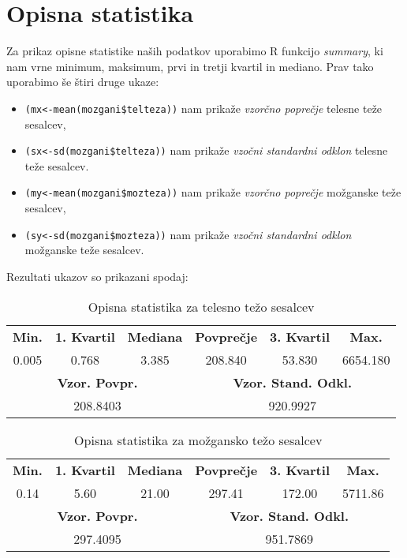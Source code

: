 \section{Opisna statistika}

Za prikaz opisne statistike naših podatkov uporabimo R funkcijo \emph{summary}, ki nam vrne minimum, maksimum,
prvi in tretji kvartil in mediano.
Prav tako uporabimo še štiri druge ukaze:

\begin{itemize}
    \item \verb|(mx<-mean(mozgani$telteza))|\label{en:mx} nam prikaže \emph{vzorčno poprečje} telesne teže sesalcev,
    \item \verb|(sx<-sd(mozgani$telteza))|\label{en:sx} nam prikaže \emph{vzočni standardni odklon} telesne teže sesalcev.
    \item \verb|(my<-mean(mozgani$mozteza))|\label{en:my} nam prikaže \emph{vzorčno poprečje} možganske teže sesalcev,
    \item \verb|(sy<-sd(mozgani$mozteza))|\label{en:sy} nam prikaže \emph{vzočni standardni odklon} možganske teže sesalcev.
\end{itemize}

\noindent
Rezultati ukazov so prikazani spodaj:

\begin{table}[h]
    \centering
    \begin{tabular}{|c|c|c|c|c|c|}
    \hline
    \textbf{Min.} & \textbf{1. Kvartil} & \textbf{Mediana} & \textbf{Povprečje} & \textbf{3. Kvartil} & \textbf{Max.} \\
    0.005 & 0.768 & 3.385 & 208.840 & 53.830 & 6654.180 \\ \hline
    \multicolumn{3}{|c|}{\textbf{Vzor. Povpr.}} & \multicolumn{3}{c|}{\textbf{Vzor. Stand. Odkl.}} \\
    \multicolumn{3}{|c|}{208.8403} & \multicolumn{3}{c|}{920.9927} \\ \hline
    \end{tabular}
    \caption{Opisna statistika za telesno težo sesalcev}
    \label{tab:telteza}
    \end{table}

\begin{table}[h]
    \centering
    \begin{tabular}{|c|c|c|c|c|c|}
    \hline
    \textbf{Min.} & \textbf{1. Kvartil} & \textbf{Mediana} & \textbf{Povprečje} & \textbf{3. Kvartil} & \textbf{Max.} \\
    0.14 & 5.60 & 21.00 & 297.41 & 172.00 & 5711.86 \\ \hline
    \multicolumn{3}{|c|}{\textbf{Vzor. Povpr.}} & \multicolumn{3}{c|}{\textbf{Vzor. Stand. Odkl.}} \\
    \multicolumn{3}{|c|}{297.4095} & \multicolumn{3}{c|}{951.7869} \\ \hline
    \end{tabular}
    \caption{Opisna statistika za možgansko težo sesalcev}
    \label{tab:mozteza}
    \end{table}

